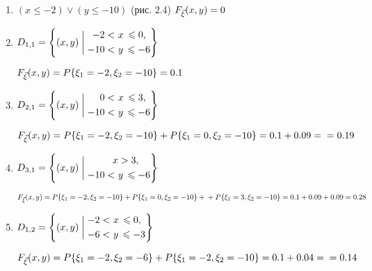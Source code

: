 \documentclass[a4paper, 20pt, titlepage]{article}
\begin{document}
\begin{enumerate}

\item $(x \leqslant -2) \vee (y \leqslant -10) $ (рис. 2.4)
$\rosp = 0$
\begin{center}
\end{center}


\item $ D_{1,1} = \set{-2}{0}{-10}{-6}$

\vspace{3mm}
$\rosp = \pr{-2}{-10} = 0.1$
\begin{center}
\end{center}

\vspace{3mm}
\item $D_{2,1} = \set{0}{3}{-10}{-6}$

\vspace{3mm}
\begin{spacing}{1.4}
$\rosp = \pr{-2}{-10} + \pr{0}{-10} = 0.1 + 0.09 = \\ = 0.19$
\end{spacing}
\begin{center}
\end{center}


\item $D_{3,1} = \setx{3}{-10}{-6}$

\vspace{3mm}
\begin{spacing}{1.4}
$\rosp = \pr{-2}{-10} + \pr{0}{-10} + \\ + \pr{3}{-10}= 0.1 + 0.09 + 0.09 = 0.28$
\end{spacing}
\begin{center}
\end{center}


\item $D_{1,2} = \set{-2}{0}{-6}{-3}$

\vspace{3mm}
\begin{spacing}{1.4}
$\rosp = \pr{-2}{-6} + \pr{-2}{-10} = 0.1 +\nolinebreak  0.04 = \\ =0.14$
\end{spacing}
\nopagebreak{}
\begin{center}
\end{center}



\end{enumerate}
\end{document}
